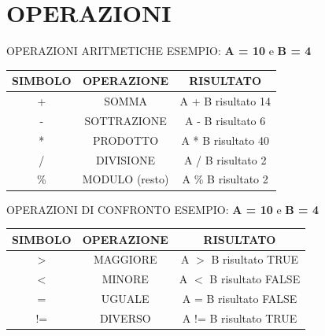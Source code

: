 \documentclass[aspectratio=1610, handout]{beamer}
\begin{document}
\section{OPERAZIONI}

\begin{frame}{OPERAZIONI ARITMETICHE}
    \centering
    ESEMPIO: \textbf{A = 10} e \textbf{B = 4} \\
    \bigskip
    \begin{tabular}{c|c|c}
        \pause
        \textbf{SIMBOLO} & \textbf{OPERAZIONE} & \textbf{RISULTATO} \\
        \hline
        \hline
        \pause
        + & SOMMA & A + B risultato 14 \\
        \hline
        \pause
        - & SOTTRAZIONE & A - B risultato 6 \\
        \hline
        \pause
        * & PRODOTTO & A * B risultato 40 \\
        \hline
        \pause
        / & DIVISIONE & A / B risultato 2 \\
        \hline
        \pause
        \% & MODULO (resto) & A \% B risultato 2 \\
        \hline
    \end{tabular}
\end{frame}

\begin{frame}{OPERAZIONI DI CONFRONTO}
    \centering
    ESEMPIO: \textbf{A = 10} e \textbf{B = 4} \\
    \bigskip
    \begin{tabular}{c|c|c}
        \pause
        \textbf{SIMBOLO} & \textbf{OPERAZIONE} & \textbf{RISULTATO} \\
        \hline
        \hline
        \pause
        $>$ & MAGGIORE & A $>$ B risultato TRUE \\
        \hline
        \pause
        $<$ & MINORE & A $<$ B risultato FALSE \\
        \hline
        \pause
        = & UGUALE & A = B risultato FALSE \\
        \hline
        \pause
        != & DIVERSO & A != B risultato TRUE \\
        \hline
    \end{tabular}
\end{frame}
\end{document}
